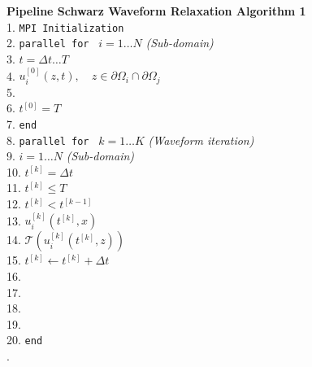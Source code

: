 \documentclass{svmult-ddm}
\begin{document}
\begin{table}[htbp]
\noindent\hrulefill
{\bf Pipeline Schwarz Waveform Relaxation Algorithm 1} 
\hrulefill \\
1. {\tt MPI Initialization}\\
2. {\tt parallel for } $i = 1\ldots N$ {\em (Sub-domain)} \\
3. \quad{} $t = \Delta t \ldots T$ \\
4. \quad\quad\quad{} $u_i^{[0]}(z,t), \quad z \in \partial\Omega_i\cap\partial\Omega_j$\\
5. \quad{} \\
6. \quad{} $t^{[0]} = T$\\
7. {\tt end} \\
8. {\tt parallel for } $k=1 \ldots K$ {\em (Waveform iteration)}\\
9. \quad{} $i = 1\ldots N$ {\em (Sub-domain)}\\
10. \quad\quad\quad{} $t^{[k]} = \Delta t$ \\
11. \quad\quad\quad{} $t^{[k]} \le T$ \\
12. \quad\quad\quad\quad\quad{} $t^{[k]} < t^{[k-1]}$ \\
13. \quad\quad\quad\quad\quad\quad\quad{} $u_i^{[k]}(t^{[k]}, x)$ \\
14. \quad\quad\quad\quad\quad\quad\quad{} $\mathcal{T}(u_i^{[k]}(t^{[k]}, z))$ \\
15. \quad\quad\quad\quad\quad\quad\quad\quad $t^{[k]} \leftarrow t^{[k]} + \Delta t$\\
16. \quad\quad\quad\quad\quad{}\\
17. \quad\quad\quad{} \\
18. \quad\quad\quad{} \\
19. \quad{}\\
20. {\tt end} \\
.\hrulefill  \\
\end{table}
\end{document}
